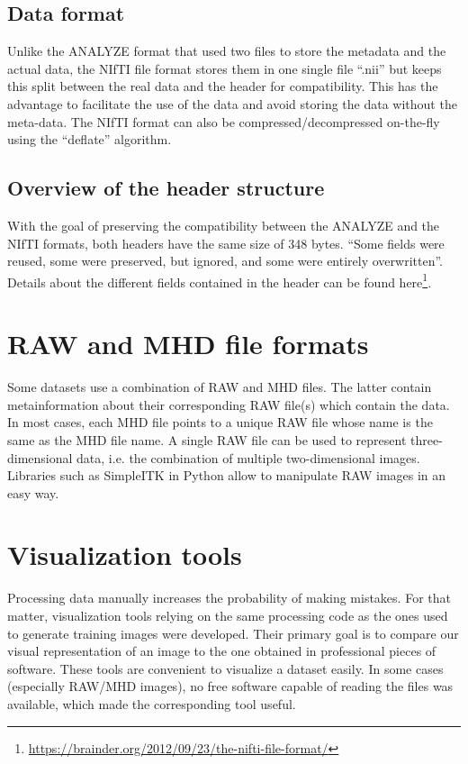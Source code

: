 \subsection{Data format}
\setlength{\marginparwidth}{3cm}\leavevmode {}Unlike the ANALYZE format that used two files to store the metadata and the actual data, the NIfTI file format stores them in one single file “.nii” but keeps this split between the real data and the header for compatibility. This has the advantage to facilitate the use of the data and avoid storing the data without the meta-data. The NIfTI format can also be compressed/decompressed on-the-fly using the “deflate”  algorithm.


\subsection{Overview of the header structure}
\setlength{\marginparwidth}{3cm}\leavevmode {}With the goal of preserving the compatibility between the ANALYZE and the NIfTI formats, both headers have the same size of 348 bytes. “Some fields were reused, some were preserved, but ignored, and some were entirely overwritten”. Details about the different fields contained in the header can be found here\footnote{\url{https://brainder.org/2012/09/23/the-nifti-file-format/}}.


\section{RAW and MHD file formats}
\setlength{\marginparwidth}{3cm}\leavevmode {}Some datasets use a combination of RAW and MHD files. The latter contain metainformation about their corresponding RAW file(s) which contain the data. In most cases, each MHD file points to a unique RAW file whose name is the same as the MHD file name. A single RAW file can be used to represent three-dimensional data, i.e. the combination of multiple two-dimensional images. Libraries such as \mbox{SimpleITK} in Python allow to manipulate RAW images in an easy way. 



\section{Visualization tools}
\setlength{\marginparwidth}{3cm}\leavevmode {}
Processing data manually increases the probability of making mistakes. For that matter, visualization tools relying on the same processing code as the ones used to generate training images were developed. Their primary goal is to compare our visual representation of an image to the one obtained in professional pieces of software. These tools are convenient to visualize a dataset easily. In some cases (especially RAW/MHD images), no free software capable of reading the files was available, which made the corresponding tool useful. 


